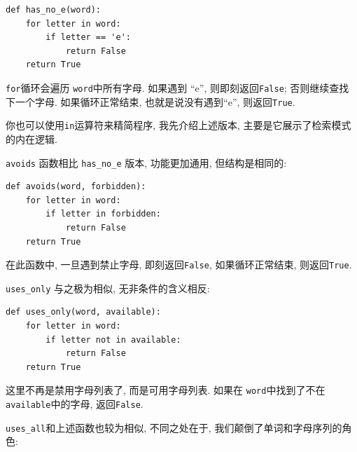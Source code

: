 \documentclass[10pt]{book}
\begin{document}
\begin{verbatim}
def has_no_e(word):
    for letter in word:
        if letter == 'e':
            return False
    return True
\end{verbatim}
%
{\tt for}循环会遍历 {\tt word}中所有字母. 
如果遇到 ``e'', 则即刻返回{\tt False};
否则继续查找下一个字母. 
如果循环正常结束, 也就是说没有遇到``e'',  则返回{\tt True}.

你也可以使用{\tt in}运算符来精简程序, 
我先介绍上述版本, 主要是它展示了检索模式的内在逻辑. 

{\tt avoids} 函数相比 \verb"has_no_e" 版本, 功能更加通用, 
但结构是相同的:

\begin{verbatim}
def avoids(word, forbidden):
    for letter in word:
        if letter in forbidden:
            return False
    return True
\end{verbatim}
%
在此函数中, 一旦遇到禁止字母, 即刻返回{\tt False}, 
如果循环正常结束, 则返回{\tt True}. 

\verb"uses_only" 与之极为相似, 无非条件的含义相反:

\begin{verbatim}
def uses_only(word, available):
    for letter in word: 
        if letter not in available:
            return False
    return True
\end{verbatim}
%
这里不再是禁用字母列表了, 而是可用字母列表. 
如果在 {\tt word}中找到了不在{\tt available}中的字母, 返回{\tt False}.

\verb"uses_all"和上述函数也较为相似, 不同之处在于, 
我们颠倒了单词和字母序列的角色:
\end{document}
